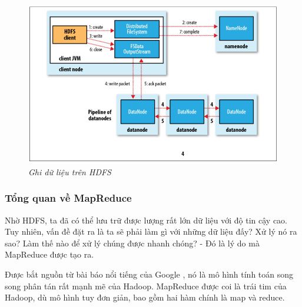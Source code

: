 \documentclass[12pt]{report}
\begin{document}
\begin{itemize}
\begin{figure}[H]
\centering
\includegraphics[width=\textwidth]{write.png}
\caption{\it Ghi dữ liệu trên HDFS \cite{write}}
\end{figure}
\end{itemize}

\subsubsection{Tổng quan về MapReduce}
Nhờ HDFS, ta đã có thể lưu trữ được lượng rất lớn dữ liệu với độ tin cậy cao. Tuy nhiên, vấn đề đặt ra là ta sẽ phải làm gì với những dữ liệu đấy? Xử lý nó ra sao? Làm thế nào để xử lý chúng được nhanh chóng? - Đó là lý do mà MapReduce được tạo ra.

Được bắt nguồn từ bài báo nổi tiếng của Google \cite{mapreduce_google}, nó là mô hình tính toán song song phân tán rất mạnh mẽ của Hadoop. MapReduce được coi là trái tim của Hadoop, dù mô hình tuy đơn giản, bao gồm hai hàm chính là map và reduce. 
\end{document}
